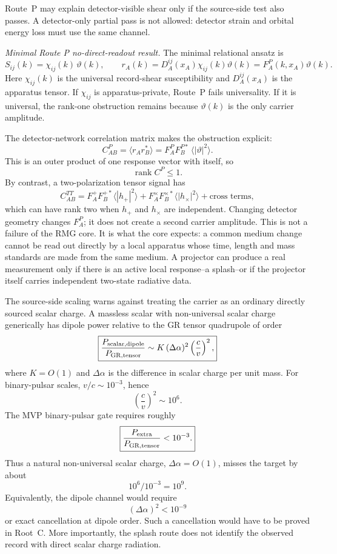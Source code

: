 \documentclass[11pt]{article}
\begin{document}
Route~P may explain detector-visible shear only if the source-side test also
passes.  A detector-only partial pass is not allowed: detector strain and
orbital energy loss must use the same channel.

\medskip\noindent\textit{Minimal Route P no-direct-readout result.}
The minimal relational ansatz is
\[
\boxed{
S_{ij}(k)=\chi_{ij}(k)\,\vartheta(k),\qquad
r_A(k)=D_A^{ij}(x_A)\chi_{ij}(k)\vartheta(k)
     =F_A^P(k,x_A)\vartheta(k).
}
\]
Here \(\chi_{ij}(k)\) is the universal record-shear susceptibility and
\(D_A^{ij}(x_A)\) is the apparatus tensor.  If \(\chi_{ij}\) is
apparatus-private, Route~P fails universality.  If it is universal, the
rank-one obstruction remains because \(\vartheta(k)\) is the only carrier
amplitude.

The detector-network correlation matrix makes the obstruction explicit:
\[
\boxed{
C^{P}_{AB}
  =\langle r_A r_B^*\rangle
  =F_A^P F_B^{P*}\,\langle |\vartheta|^2\rangle .
}
\]
This is an outer product of one response vector with itself, so
\[
\boxed{\operatorname{rank} C^P\le 1.}
\]
By contrast, a two-polarization tensor signal has
\[
\boxed{
C^{TT}_{AB}
=F_A^+F_B^{+*}\langle |h_+|^2\rangle
 +F_A^\times F_B^{\times *}\langle |h_\times|^2\rangle
 +\text{cross terms},
}
\]
which can have rank two when \(h_+\) and \(h_\times\) are independent.
Changing detector geometry changes \(F_A^P\); it does not create a second
carrier amplitude.  This is not a failure of the RMG core.  It is what the
core expects: a common medium change cannot be read out directly by a local
apparatus whose time, length and mass standards are made from the same medium.
A projector can produce a real measurement only if there is an active local
response--a splash--or if the projector itself carries independent two-state
radiative data.

The source-side scaling warns against treating the carrier as an ordinary
directly sourced scalar charge.  A
massless scalar with non-universal scalar charge generically has dipole power
relative to the GR tensor quadrupole of order
\[
\boxed{
\frac{P_{\rm scalar,dipole}}{P_{\rm GR,tensor}}
\sim K\,(\Delta\alpha)^2\left(\frac{c}{v}\right)^2,
}
\]
where \(K=O(1)\) and \(\Delta\alpha\) is the difference in scalar charge per
unit mass.  For binary-pulsar scales, \(v/c\sim10^{-3}\), hence
\[
\boxed{
\left(\frac{c}{v}\right)^2\sim10^6.
}
\]
The MVP binary-pulsar gate requires roughly
\[
\boxed{\frac{P_{\rm extra}}{P_{\rm GR,tensor}}<10^{-3}.}
\]
Thus a natural non-universal scalar charge, \(\Delta\alpha=O(1)\), misses the
target by about
\[
\boxed{10^6/10^{-3}=10^9.}
\]
Equivalently, the dipole channel would require
\[
\boxed{(\Delta\alpha)^2<10^{-9}}
\]
or exact cancellation at dipole order.  Such a cancellation would have to be
proved in Root~C.  More importantly, the splash route does not identify the
observed record with direct scalar charge radiation.
\end{document}
